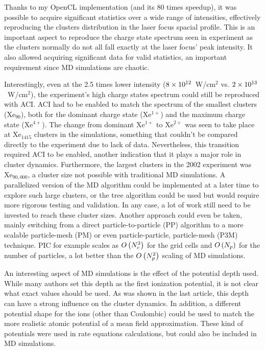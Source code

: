 Thanks to my OpenCL implementation (and its 80 times speedup), it was possible
to acquire significant statistics over a wide range of intensities, effectively
reproducing the clusters distribution in the laser focus spacial profile. This
is an important aspect to reproduce the charge state spectrum seen in experiment
as the clusters normally do not all fall exactly at the laser focus' peak
intensity. It also allowed acquiring significant data for valid statistics, an
important requirement since MD simulations are chaotic.

Interestingly, even at the 2.5 times lower intensity ($\ten{8}{12}$~W/cm$^{2}$
vs. $\ten{2}{13}$~W/cm$^{2}$), the experiment's high charge states spectrum
could still be reproduced with ACI. ACI had to
be enabled to match the spectrum of the smallest clusters (Xe$_{90}$), both
for the dominant charge state (Xe$^{1+}$) and the maximum charge state (Xe$^{4+}$).
The change from dominant Xe$^{1+}$ to Xe$^{2+}$ was seen to take place at
Xe$_{1415}$ clusters in the simulations, something that couldn't be compared
directly to the experiment due to lack of data. Nevertheless, this transition
required ACI to be
enabled, another indication that it plays a major role in cluster dynamics.
Furthermore, the largest clusters in the 2002 experiment was Xe$_{90,000}$, a
cluster size not possible with traditional MD simulations. A parallelized
version of the MD algorithm could be implemented at a later time to explore such
large clusters, or the tree algorithm could be used but would require more
rigorous testing and validation. In any case, a lot of work still need to be
invested to reach these cluster sizes. Another approach could even be taken,
mainly switching from a direct particle-to-particle (PP) algorithm to a more
scalable particle-mesh (PM) or even particle-particle, particle-mesh (P3M)
technique. PIC for example scales as $O\left( N_c^3 \right)$ for the grid cells and
$O\left( N_p \right)$ for the number of particles, a lot better than the $O\left( N_p^2 \right)$
scaling of MD simulations.

An interesting aspect of MD simulations is the effect of the potential depth
used. While many authors set this depth as the first ionization potential, it
is not clear what exact values should be used. As was shown in the last article,
this depth can have a strong influence on the cluster dynamics. In addition, a
different potential shape for the ions (other than Coulombic) could be used to
match the more realistic atomic potential of a mean field approximation. These
kind of potentials were used in rate equations calculations, but could also be
included in MD simulations.




